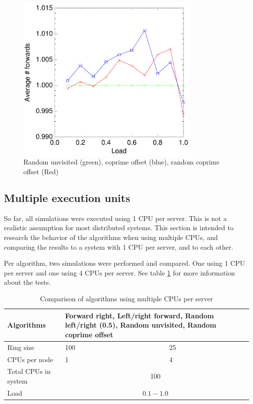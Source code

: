 \documentclass[10pt,a4paper]{article}
\begin{document}
\begin{figure}[h!tb]
\centering
\includegraphics[width=0.8\textwidth]{data/randunvisited_prime_randprime.pdf}
\caption{Random unvisited (green), coprime offset (blue), random coprime offset (Red)}
\label{figrurrp}
\end{figure}



\subsection{Multiple execution units}
So far, all simulations were executed using 1 CPU per server. This is not a realistic assumption for most distributed systems. This section is intended to research the behavior of the algorithms when using multiple CPUs, and comparing the results to a system with 1 CPU per server, and to each other.

Per algorithm, two simulations were performed and compared. One using 1 CPU per server and one using 4 CPUs per server. See table \ref{tabcpus} for more information about the tests.

\begin{table}[h!]
\centering
\begin{tabular}{|p{}|p{}|p{}|} \hline
Algorithms & \multicolumn{2}{|p{0.7\textwidth}|}{Forward right, Left/right forward, Random left/right (0.5), Random unvisited, Random coprime offset} \\ \hline
Ring size & 100 & 25 \\ \hline
CPUs per node	& 1 & 4 \\ \hline
Total CPUs in system & \multicolumn{2}{|c|}{100} \\ \hline
Load	& \multicolumn{2}{|c|}{$0.1 - 1.0$} \\ \hline
\end{tabular}
\caption{Comparison of algorithms using multiple CPUs per server}
\label{tabcpus}
\end{table}
\end{document}
